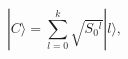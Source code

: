 \begin{equation}
 | C \rangle = \sum_{l=0}^k \sqrt{S_0{}^l} | l \rangle,
\label{Cardy}
\end{equation}

